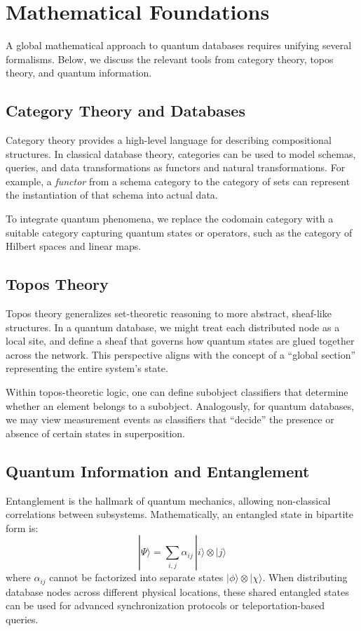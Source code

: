 \documentclass[12pt]{article}
\theoremstyle{definition}
\theoremstyle{remark}
\begin{document}
\section{Mathematical Foundations}
\label{sec:foundations}
A global mathematical approach to quantum databases requires unifying several formalisms. Below, we discuss the relevant tools from category theory, topos theory, and quantum information.

\subsection{Category Theory and Databases}
Category theory provides a high-level language for describing compositional structures. In classical database theory, categories can be used to model schemas, queries, and data transformations as functors and natural transformations. For example, a \textit{functor} from a schema category to the category of sets can represent the instantiation of that schema into actual data.

To integrate quantum phenomena, we replace the codomain category with a suitable category capturing quantum states or operators, such as the category of Hilbert spaces and linear maps.

\subsection{Topos Theory}
Topos theory generalizes set-theoretic reasoning to more abstract, sheaf-like structures. In a quantum database, we might treat each distributed node as a local site, and define a sheaf that governs how quantum states are glued together across the network. This perspective aligns with the concept of a ``global section'' representing the entire system's state.

Within topos-theoretic logic, one can define subobject classifiers that determine whether an element belongs to a subobject. Analogously, for quantum databases, we may view measurement events as classifiers that ``decide'' the presence or absence of certain states in superposition. 

\subsection{Quantum Information and Entanglement}
Entanglement is the hallmark of quantum mechanics, allowing non-classical correlations between subsystems. Mathematically, an entangled state in bipartite form is:
\[
|\Psi\rangle = \sum_{i,j} \alpha_{ij} \, |i\rangle \otimes |j\rangle
\]
where $\alpha_{ij}$ cannot be factorized into separate states $|\phi\rangle \otimes |\chi\rangle$. When distributing database nodes across different physical locations, these shared entangled states can be used for advanced synchronization protocols or teleportation-based queries.
\end{document}
